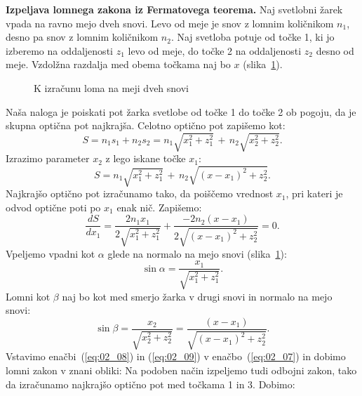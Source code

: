 \begin{example}
{\bf Izpeljava lomnega zakona iz Fermatovega teorema.}
Naj svetlobni žarek vpada na ravno mejo dveh snovi. Levo od meje je snov 
z lomnim količnikom $n_1$, desno pa snov z lomnim količnikom $n_2$. Naj svetloba
potuje od točke 1, ki jo izberemo na oddaljenosti $z_1$ levo 
od meje, do točke 2 na oddaljenosti $z_2$ desno od meje. Vzdolžna razdalja med obema
točkama naj bo $x$ (slika~\ref{fig:02_FerLom}). 
\begin{figure}[ht]
\centering
\def\svgwidth{100truemm} 

\caption{K izračunu loma na meji dveh snovi}
\label{fig:02_FerLom}
\end{figure}

Naša naloga je poiskati pot žarka svetlobe od točke 1 do točke 2 ob pogoju, 
da je skupna optična pot najkrajša.
Celotno optično pot zapišemo kot:
\begin{equation}
S = n_1 s_1 + n_2 s_2 = n_1 \sqrt{x_1^2+z_1^2}\, +\, n_2 \sqrt{x_2^2+z_2^2}.
\label{eq:02_05}
\end{equation}
Izrazimo parameter $x_2$ z lego iskane točke $x_1$: 
\begin{equation}
S = n_1 \sqrt{x_1^2+z_1^2}\, +\, n_2 \sqrt{(x-x_1)^2+z_2^2}.
\label{eq:02_06}
\end{equation}
Najkrajšo optično pot izračunamo tako, da poiščemo vrednost $x_1$, 
pri kateri je odvod optične poti po $x_1$ enak nič. Zapišemo:
\begin{equation}
\frac{dS}{dx_1} = \frac{2 n_1 x_1}{2 \sqrt{x_1^2+z_1^2}}+
\frac{-2n_2 (x-x_1)}{2 \sqrt{(x-x_1)^2+z_2^2}} = 0.
\label{eq:02_07}
\end{equation}
Vpeljemo vpadni kot $\alpha$ glede na normalo na mejo snovi (slika~\ref{fig:02_FerLom}):
\begin{equation}
\sin \alpha = \frac{x_1}{\sqrt{x_1^2+z_1^2}}.
\label{eq:02_08}
\end{equation}
Lomni kot $\beta$ naj bo kot med smerjo žarka v drugi snovi in normalo na mejo snovi: 
\begin{equation}
\sin \beta = \frac{x_2}{\sqrt{x_2^2+z_2^2}} = \frac{(x-x_1)}{\sqrt{(x-x_1)^2+z_2^2}}.
\label{eq:02_09}
\end{equation}
Vstavimo enačbi~(\ref{eq:02_08}) in (\ref{eq:02_09}) v enačbo~(\ref{eq:02_07})
in dobimo lomni zakon v znani obliki:
Na podoben način izpeljemo tudi odbojni zakon, tako da izračunamo 
najkrajšo optično pot med točkama 1 in 3. Dobimo:
\end{example}

